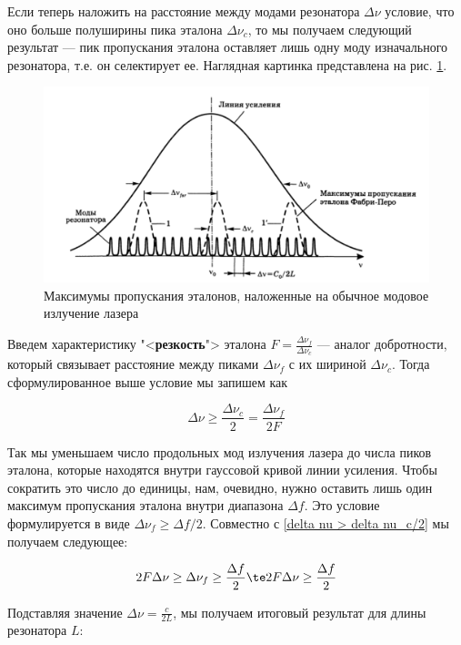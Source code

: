 \documentclass[12pt]{kiarticle}
\begin{document}
Если теперь наложить на расстояние между модами резонатора $ \Delta \nu $ условие, что оно больше полуширины пика эталона $ \Delta \nu_c $, то мы получаем следующий результат --- пик пропускания эталона оставляет лишь одну моду изначального резонатора, т.е. он селектирует ее. Наглядная картинка представлена на рис. \ref{selection}. 

\begin{figure}[h!]
 	\centering
 	\includegraphics[width=0.7\linewidth]{selection}
 	\caption{{\small Максимумы пропускания эталонов, наложенные на обычное модовое излучение лазера}}
 	\label{selection}
\end{figure}

Введем характеристику "<\textbf{резкость}"> эталона $ F = \frac{\Delta \nu_f}{\Delta \nu_c} $ --- аналог добротности, который связывает расстояние между пиками $ \Delta \nu_f $ с их шириной $ \Delta \nu_c $. Тогда сформулированное выше условие мы запишем как

\begin{equation}\label{delta nu > delta nu_c/2}
\Delta \nu \geq \dfrac{\Delta \nu_c}{2} = \dfrac{\Delta \nu_f}{2F}
\end{equation}

Так мы уменьшаем число продольных мод излучения лазера до числа пиков эталона, которые находятся внутри гауссовой кривой линии усиления. Чтобы сократить это число до единицы, нам, очевидно, нужно оставить лишь один максимум пропускания эталона внутри диапазона $ \Delta f $. Это условие формулируется в виде $ \Delta \nu_f \geq \Delta f /2$. Совместно с \eqref{delta nu > delta nu_c/2}  мы получаем следующее:

\begin{equation}\label{}
2 F \Delta \nu \geq \Delta \nu_f \geq \dfrac{\Delta f}{2} \te 2 F \Delta \nu \geq \dfrac{\Delta f}{2}
\end{equation}

Подставляя значение $ \Delta \nu = \frac{c}{2L} $, мы получаем итоговый результат для длины резонатора $ L $:
\end{document}
